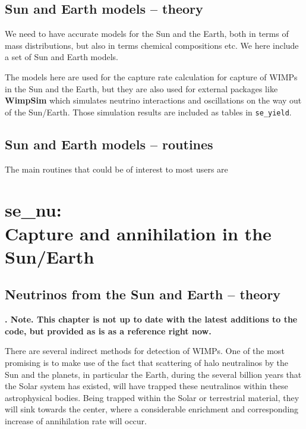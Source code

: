 \documentclass[a4paper,10pt,oneside]{book}
\newcommand{\comment}[1]{}
\newcommand{\codeb}[1]{\ftb{#1}}
\newcommand{\ftb}[1]{{\bfseries \sffamily #1}}
\begin{document}
\section{Sun and Earth models -- theory}


We need to have accurate models for the Sun and the Earth, both in terms of mass distributions, but also in terms chemical compositions etc. We here include
a set of Sun and Earth models.

The models here are used for the capture rate calculation for capture of WIMPs in the Sun and the Earth, but they are also used for external packages like \ftb{WimpSim} which simulates neutrino interactions and oscillations on the way out of the Sun/Earth. Those simulation results are included as tables in \texttt{se\_yield}.
\section{Sun and Earth models -- routines}

The main routines that could be of interest to most users are


\chapter[se\_nu: Capture and annihilation in the Sun/Earth]{\codeb{se\_nu}:\\ Capture and annihilation in the Sun/Earth}
\label{ch:src/se_nu}

\section{Neutrinos from the Sun and Earth --  theory}

\comment{Update this section.}

{\bfseries. Note. This chapter is not up to date with the latest additions to the code, but provided as is as a reference right now.}

There are several indirect methods for detection of WIMPs.
One of the most promising \cite{Krauss:1985unpub,Press:1985ug,Silk:1985ax,Krauss:1985ks,Krauss:1985aaa,Gaisser:1986ha,Griest:1986yu,Hagelin:1986gv,Freese:1985qw,Kamionkowski:1991nj,Halzen:1991kh,Bottino:1991dy,Bottino:1994xp,Gandhi:1993ce,Bergstrom:1996kp,Bergstrom:1998xh} is to make use of the
fact that scattering of halo neutralinos by the Sun and the planets,
in particular the Earth, during the several
billion years that the Solar system has existed, will have trapped
these neutralinos within these astrophysical bodies. Being trapped
within the Solar or terrestrial material, they will sink towards
the center, where a considerable enrichment and corresponding
increase of annihilation rate will occur.
\end{document}
